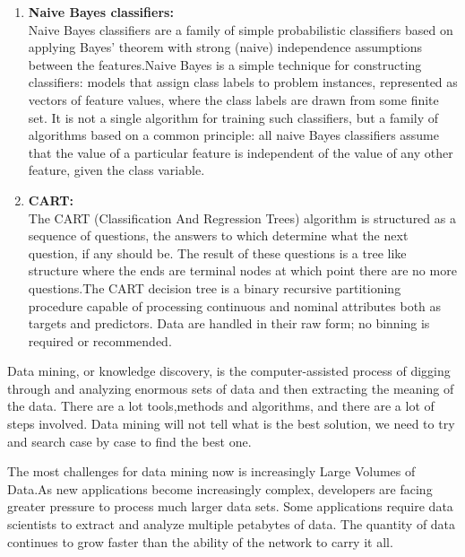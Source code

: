 \documentclass[fleqn,10pt]{SelfArx} %
\begin{document}
\begin{enumerate}
\item \textbf{Naive Bayes classifiers:}\\Naive Bayes classifiers are a family of simple probabilistic classifiers based on applying Bayes' theorem with strong (naive) independence assumptions between the features.Naive Bayes is a simple technique for constructing classifiers: models that assign class labels to problem instances, represented as vectors of feature values, where the class labels are drawn from some finite set. It is not a single algorithm for training such classifiers, but a family of algorithms based on a common principle: all naive Bayes classifiers assume that the value of a particular feature is independent of the value of any other feature, given the class variable.
\item \textbf{CART:}\\The CART (Classification And Regression Trees) algorithm is structured as a sequence of questions, the answers to which determine what the next question, if any should be.  The result of these questions is a tree like structure where the ends are terminal nodes at which point there are no more questions.The CART decision tree is a binary recursive partitioning procedure capable of processing continuous and nominal attributes both as targets and predictors. Data are handled in their raw form; no binning is required or recommended.
\end{enumerate}

Data mining, or knowledge discovery, is the computer-assisted process of digging through and analyzing enormous sets of data and then extracting the meaning of the data. There are a lot tools,methods and algorithms, and there are a lot of steps involved. Data mining will not tell what is the best solution, we need to try and search case by case to find the best one.\

The most challenges for data mining now is increasingly Large Volumes of Data.As new applications become increasingly complex, developers are facing greater pressure to process much larger data sets. Some applications require data scientists to extract and analyze multiple petabytes of data. The quantity of data continues to grow faster than the ability of the network to carry it all.

%
%   
\end{document}
